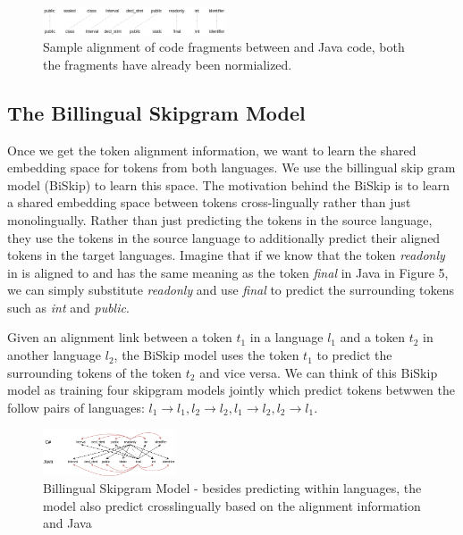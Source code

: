 \begin{figure}[t!]
	
	\includegraphics[width=0.48\textwidth]{alignment}
	\caption{Sample alignment of code fragments between  and Java code, both the fragments have already been normialized.}
	\label{fig:clf}
\end{figure}

\subsection{The Billingual Skipgram Model}

Once we get the token alignment information, we want to learn the shared embedding space for tokens from both languages. We use the billingual skip gram model (BiSkip) \cite{luong2015bilingual} to learn this space. The motivation behind the BiSkip is to learn a shared embedding space between tokens cross-lingually rather than just monolingually. Rather than just predicting the tokens in the source language, they use the tokens in the source language to additionally predict their aligned tokens in the target languages. Imagine that if we know that the token \textit{readonly} in  is aligned to and has the same meaning as the token \textit{final} in Java in Figure 5, we can simply substitute \textit{readonly} and use \textit{final} to predict the surrounding tokens such as \textit{int} and \textit{public}. 

Given an alignment link between a token $t_{1}$ in a language $l_{1}$ and a token $t_{2}$ in another language $l_{2}$, the BiSkip model uses the token $t_{1}$ to predict the surrounding tokens of the token $t_{2}$ and vice versa. We can think of this BiSkip model as training four skipgram models jointly which predict tokens betwwen the follow pairs of languages: $l_{1} \rightarrow l_{1}, l_{2} \rightarrow l_{2}, l_{1} \rightarrow l_{2}, l_{2} \rightarrow l_{1}$.



\begin{figure}[t!]
	\includegraphics[width=0.35\textwidth]{biskip_align}
	\caption{Billingual Skipgram Model - besides predicting within languages, the model also predict crosslingually based on the alignment information  and Java}
	\label{fig:clf}
\end{figure}

